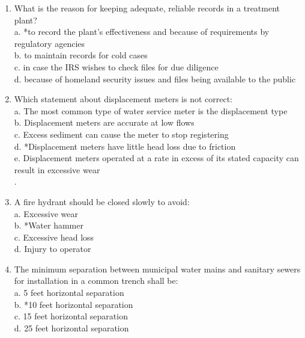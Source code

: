 
\begin{enumerate}[1.]







  \item What is the reason for keeping adequate, reliable records in a treatment plant?\\
a. *to record the plant's effectiveness and because of requirements by regulatory agencies\\
b. to maintain records for cold cases\\
c. in case the IRS wishes to check files for due diligence\\
d. because of homeland security issues and files being available to the public\\

\item Which statement about displacement meters is not correct:\\
a. The most common type of water service meter is the displacement type\\
b. Displacement meters are accurate at low flows\\
c. Excess sediment can cause the meter to stop registering\\
d. *Displacement meters have little head loss due to friction\\
e. Displacement meters operated at a rate in excess of its stated capacity can result in
excessive wear\\.

\item  A fire hydrant should be closed slowly to avoid:\\
a. Excessive wear\\
b. *Water hammer\\
c. Excessive head loss\\
d. Injury to operator\\

\item The minimum separation between municipal water mains and sanitary sewers for installation in a common trench shall be:\\
a. 5 feet horizontal separation\\
b. *10 feet horizontal separation\\
c. 15 feet horizontal separation\\
d. 25 feet horizontal separation\\


\end{enumerate}
